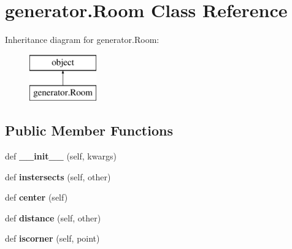 \hypertarget{classgenerator_1_1_room}{}\section{generator.\+Room Class Reference}
\label{classgenerator_1_1_room}
Inheritance diagram for generator.\+Room\+:\begin{figure}[H]
\begin{center}
\leavevmode
\includegraphics[height=2.000000cm]{classgenerator_1_1_room}
\end{center}
\end{figure}
\subsection*{Public Member Functions}
\begin{DoxyCompactItemize}
\item 
\hypertarget{classgenerator_1_1_room_a40f113ffc6a8bdf330d2ea6c1c84c3db}{}def {\bfseries \+\_\+\+\_\+init\+\_\+\+\_\+} (self, kwargs)\label{classgenerator_1_1_room_a40f113ffc6a8bdf330d2ea6c1c84c3db}

\item 
\hypertarget{classgenerator_1_1_room_aa48e18a9af33db52e1638b2ca74f97da}{}def {\bfseries instersects} (self, other)\label{classgenerator_1_1_room_aa48e18a9af33db52e1638b2ca74f97da}

\item 
\hypertarget{classgenerator_1_1_room_a932bce0f29cc1ec2b2ba0f386522c54b}{}def {\bfseries center} (self)\label{classgenerator_1_1_room_a932bce0f29cc1ec2b2ba0f386522c54b}

\item 
\hypertarget{classgenerator_1_1_room_aa325f02c62b3836cff71fe00721386f0}{}def {\bfseries distance} (self, other)\label{classgenerator_1_1_room_aa325f02c62b3836cff71fe00721386f0}

\item 
\hypertarget{classgenerator_1_1_room_a7b1838d77f305ea20398a44171c08d65}{}def {\bfseries iscorner} (self, point)\label{classgenerator_1_1_room_a7b1838d77f305ea20398a44171c08d65}

\end{DoxyCompactItemize}
